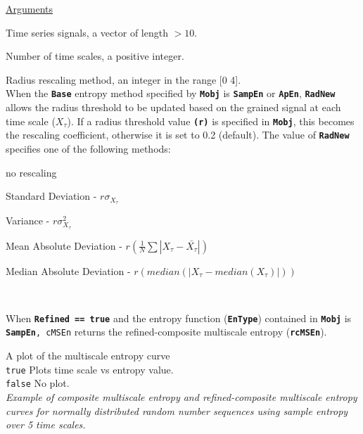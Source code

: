 \documentclass[12pt, a4paper, titlepage, openany]{book}
\begin{document}
\noindent \ul{Arguments}
\begin{description}[labelsep=1cm, labelwidth=2cm, nosep, style=multiline,leftmargin=3cm]\footnotesize
\item[\texttt{Sig}]		Time series signals, a vector of length $> 10$.
\item[\texttt{Scales}]		Number of time scales, a positive integer.
\item[\texttt{RadNew}]			Radius rescaling method, an integer in the range [0 4].\\
				 When the \texttt{\textbf{Base}} entropy method specified by \texttt{\textbf{Mobj}} is \texttt{\textbf{SampEn}} or \texttt{\textbf{ApEn}}, \texttt{\textbf{RadNew}} allows the radius threshold to be updated based on the grained signal at each time scale ($X_\tau$). If a radius threshold value \texttt{\textbf{(r)}} is specified in \texttt{\textbf{Mobj}},  this becomes the rescaling coefficient, otherwise it is set to 0.2 (default). The value of \texttt{\textbf{RadNew}} specifies one of the following methods:
	\begin{description}[labelsep=5em, labelwidth=4em, nosep,style=multiline,leftmargin=2cm]
		\item[0]	no rescaling
		\item[1]    Standard Deviation          - $r\sigma_{X_\tau}$
        \item[2]    Variance                    - $r\sigma_{X_\tau}^2$
        \item[3]    Mean Absolute Deviation     - $r(\frac{1}{N} \sum |X_{\tau} - \bar{X_{\tau}}|) $
        \item[4]    Median Absolute Deviation   - $r(median(|X_{\tau} - median(X_{\tau})|)) $
	\end{description}
\ \\ 
\item[\texttt{Refined}]	 When \textbf{\texttt{Refined == true}} and the entropy function (\textbf{\texttt{EnType}}) contained in  \textbf{\texttt{Mobj}} is \texttt{\textbf{SampEn}, cMSEn} returns the refined-composite multiscale entropy (\texttt{\textbf{rcMSEn}}). \indent \cite{cMS2}
\item[\texttt{Plotx}]		A plot of the multiscale entropy curve\\
							\texttt{true} \hspace{15pt} Plots time scale vs entropy value.\\
							\texttt{false}\hspace{12pt} No plot.\\ 							\textit{Example of composite multiscale entropy and refined-composite multiscale entropy curves for normally distributed random number sequences using sample entropy over 5 time scales.}\\

\end{description}
\end{document}
